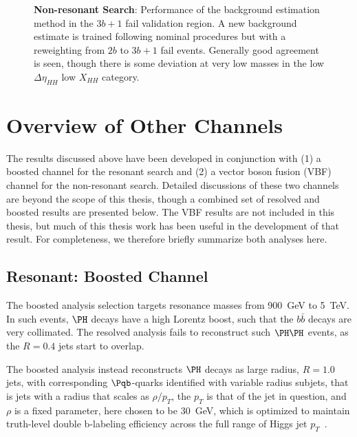\begin{figure}[ht]
  \centering
  \hspace*{-2cm}
  \caption{\label{fig:nonres-sr-mhh-3b1f} \textbf{Non-resonant Search}: Performance of the background estimation 
  method in the $3b+1$ fail validation region. A new background estimate is trained following nominal procedures 
  but with a reweighting from $2b$ to $3b+1$ fail events. Generally good agreement is seen, though there is some 
  deviation at very low masses in the low $\Delta\eta_{HH}$ low $X_{HH}$ category.}
\end{figure}


\FloatBarrier
\clearpage
\section{Overview of Other \bbbb Channels}
The results discussed above have been developed in conjunction with (1) a boosted channel 
for the resonant search and (2) a vector boson fusion (VBF) channel for the non-resonant search. 
Detailed discussions of these two channels are beyond the scope of this thesis, though a 
combined set of resolved and boosted results are presented below. The VBF results are 
not included in this thesis, but much of this thesis work has been useful in the development 
of that result. For completeness, we therefore briefly summarize both analyses here.

\subsection{Resonant: Boosted Channel}
The boosted analysis selection targets resonance masses from \SI{900}{\GeV} to \SI{5}{\TeV}.
In such events, $\higgs$ decays have a high Lorentz boost, such that the $b\bar{b}$ decays are
very collimated. The resolved analysis fails to reconstruct such $\higgs\higgs$ events, as the 
$R=0.4$ jets start to overlap. 

The boosted analysis instead reconstructs $\higgs$ decays as large radius, $R=1.0$ jets, with 
corresponding $\Pqb$-quarks identified with variable radius subjets, that is jets with a 
radius that scales as $\rho / p_{T}$, the $p_{T}$ is that of the jet in question, and
$\rho$ is a fixed parameter, here chosen to be \SI{30}{\GeV}, which is optimized to maintain 
truth-level double b-labeling efficiency across the full range of Higgs jet $p_{T}$~\cite{ATL-PHYS-PUB-2017-010}.

